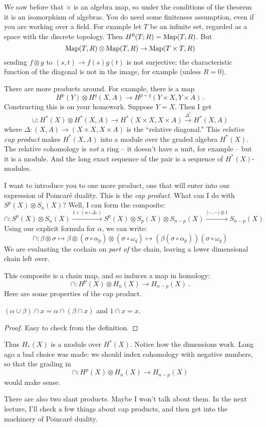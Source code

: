 We saw before that $\times$ is an algebra map, so under the conditions of the
theorem it is an isomorphism of algebras. You do need some finiteness 
assumption, even if you are working over a field. For example let $T$ be an
infinite set, regarded as a space with the discrete topology. Then 
$H^0(T;R)=\operatorname{Map}(T,R)$. But
\[
\operatorname{Map}(T,R)\otimes\operatorname{Map}(T,R)\to\operatorname{Map}(T\times T,R)
\]
sending $f\otimes g$ to $(s,t)\to f(s)g(t)$ is not surjective; the 
characteristic function of the diagonal is not in the image, for example
(unless $R=0$).

There are more products around. For example, there is a map 
\[
H^p(Y)\otimes H^q(X,A)\to H^{p+q}(Y\times X,Y\times A)\,.
\]
Constructing this is on your homework. Suppose $Y=X$. 
Then I get 
\[
\cup: H^\ast(X)\otimes H^\ast(X,A)\to H^\ast(X\times X,X\times A)\xrightarrow{\Delta^\ast} H^\ast(X,A)
\]
where $\Delta:(X,A)\to (X\times X,X\times A)$ is the ``relative diagonal.'' 
This {\em relative cup product} makes $ H^\ast(X,A)$ into a module over the graded algebra $ H^\ast(X)$. The relative cohomology is \emph{not} a ring -- it doesn't have a unit, for example -- but it is a module. And the long exact sequence of the pair is a sequence of $ H^\ast(X)$-modules. 

I want to introduce you to one more product, one that will enter into our
expression of Poincar\'{e} duality. This is the {\em cap product}.
What can I do with $S^p(X)\otimes S_n(X)$? Well, I can form the composite:
\begin{equation*}
\cap:S^p(X)\otimes S_n(X)\xrightarrow{1\times (\alpha\circ \Delta_\ast)} S^p(X)\otimes S_p(X)\otimes S_{n-p}(X)\xrightarrow{\langle -,-\rangle\otimes 1}S_{n-p}(X)
\end{equation*}
Using our explicit formula for $\alpha$, we can write:
\begin{equation*}
\cap:\beta\otimes\sigma\mapsto\beta\otimes(\sigma\circ\alpha_p)\otimes(\sigma\circ\omega_q)\mapsto\left(\beta(\sigma\circ\alpha_p)\right) (\sigma\circ\omega_q)
\end{equation*}
We are evaluating the cochain on {\em part of} the chain, leaving a lower 
dimensional chain left over.

This composite is a chain map, and so induces a map in homology:
\[
\cap:H^p(X)\otimes H_n(X)\to H_{n-p}(X)\,.
\]
Here are some properties of the cap product.
\begin{lemma}
$(\alpha\cup\beta)\cap x=\alpha\cap(\beta\cap x)$ and $1\cap x=x$.
\end{lemma}
\begin{proof}
Easy to check from the definition.
\end{proof}
Thus $ H_\ast(X)$ is a module over $ H^\ast(X)$. Notice how the dimensions work. Long ago a bad choice was made: we should index cohomology with negative numbers, so that the grading in 
\[
\cap: H^p(X)\otimes H_n(X)\to H_{n-p}(X)
\]
would make sense. 

There are also two slant products. Maybe I won't talk about them. In the next lecture, I'll check a few things about cap products, and then get into the machinery of Poincar\'{e} duality.
